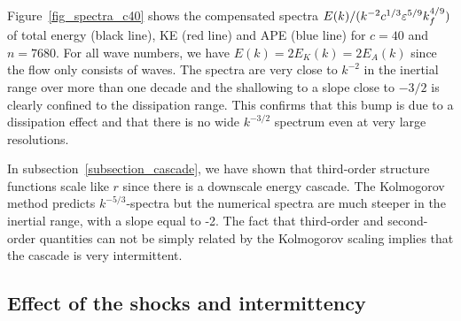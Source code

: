 Figure~\ref{fig_spectra_c40} shows the compensated spectra $E(k) / (
k^{-2} c^{1/3} \varepsilon^{5/9} k_f^{4/9} )$ of total energy (black line),
KE (red line) and APE (blue line) for $c = 40$ and $n = 7680$.  For
all wave numbers, we have $E(k) = 2E_K(k) = 2E_A(k)$ since the flow
only consists of  waves.
%
The spectra are very close to $k^{-2}$ in the inertial range over more
than one decade and the shallowing to a slope close to $-3/2$ is
clearly confined to the dissipation range.  This confirms that this
bump is due to a dissipation effect and that there is no wide
$k^{-3/2}$ spectrum even at very large resolutions.






In subsection~\ref{subsection_cascade}, we have shown that third-order
structure functions scale like $r$ since there is a downscale energy
cascade.
%
The Kolmogorov method predicts $k^{-5/3}$-spectra but the numerical
spectra are much steeper in the inertial range, with a slope equal to
-2.  The fact that third-order and second-order quantities can not be
simply related by the Kolmogorov scaling implies that the cascade is
very intermittent.




\subsection{Effect of the shocks and intermittency}




